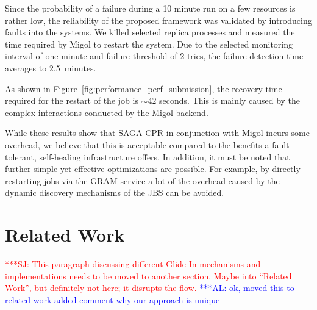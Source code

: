 \documentclass{rspublic}
\newcommand{\alnote}[1]{ {\textcolor{blue} { ***AL: #1 }}}
\newcommand{\jhanote}[1]{ {\textcolor{red} { ***SJ: #1 }}}
\newcommand{\alnote}[1]{}
\newcommand{\jhanote}[1]{}
\begin{document}
Since the probability of a failure during a 10 minute run on a few
resources is rather low, the reliability of the proposed framework was
validated by introducing faults into the systems. We killed selected
replica processes and measured the time required by Migol to restart
the system.  Due to the selected monitoring interval of one minute and
failure threshold of 2 tries, the failure detection time averages to
2.5\, minutes.

As shown in Figure~\ref{fig:performance_perf_submission}, the recovery
time required for the restart of the job is $\sim42$ seconds. This is
mainly caused by the complex interactions conducted by the Migol
backend.


While these results show that SAGA-CPR in conjunction with Migol
incurs some overhead, we believe that this is acceptable compared to
the benefits a fault-tolerant, self-healing infrastructure offers. In
addition, it must be noted that further simple yet effective
optimizations are possible. For example, by directly restarting jobs
via the GRAM service a lot of the overhead caused by the dynamic
discovery mechanisms of the JBS can be avoided. 



\section{Related Work}

\jhanote{This paragraph discussing different Glide-In mechanisms and
  implementations needs to be moved to another section. Maybe into
  ``Related Work'', but definitely not here; it disrupts the flow.}
\alnote{ok, moved this to related work added comment why our approach is unique}
  
\end{document}
